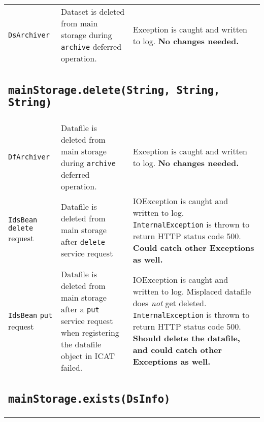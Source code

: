 \documentclass[paper=a4]{scrartcl}
\begin{document}
\begin{longtable}{ p{32mm} | p{48mm} | p{48mm} }
    \raggedright \texttt{DsArchiver} &
    \raggedright Dataset is deleted from main storage during \texttt{archive} deferred operation. &
    \raggedright Exception is caught and written to log. \textbf{No changes needed.}
    \tabularnewline

    \multicolumn{3}{p{\textwidth}}{
      \subsection{\texttt{mainStorage.delete(String, String, String)}}
    } \\

    \raggedright \texttt{DfArchiver} &
    \raggedright Datafile is deleted from main storage during \texttt{archive} deferred operation. &
    \raggedright Exception is caught and written to log. \textbf{No changes needed.}
    \tabularnewline[4mm]
    \raggedright \texttt{IdsBean} \texttt{delete} request &
    \raggedright Datafile is deleted from main storage after \texttt{delete} service request &
    \raggedright IOException is caught and written to log. \texttt{InternalException} is thrown to return HTTP status code 500. \textbf{Could catch other Exceptions as well.}
    \tabularnewline[4mm]
    \raggedright \texttt{IdsBean} \texttt{put} request &
    \raggedright Datafile is deleted from main storage after a \texttt{put} service request when registering the datafile object in ICAT failed. &
    \raggedright IOException is caught and written to log. Misplaced datafile does \textit{not} get deleted. \texttt{InternalException} is thrown to return HTTP status code 500. \textbf{Should delete the datafile, and could catch other Exceptions as well.}
    \tabularnewline

    \multicolumn{3}{p{\textwidth}}{
      \subsection{\texttt{mainStorage.exists(DsInfo)}}
    } \\


\end{longtable}
\end{document}
